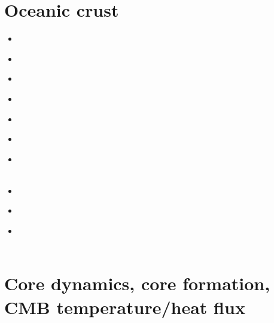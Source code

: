 \section{Oceanic crust} 

\begin{scriptsize}
\begin{itemize}
\item[\nineteeneightyeight] 
\textcite{mofo88} \\
\item[\nineteenninetyfour] 
\textcite{chho94} \\
\item[\nineteenninetysix] 
\textcite{vaky96} \\
\item[\twothousandfour] 
\textcite{vavv04b} \\
\item[\twothousandseven] 
\textcite{brva07b} \\
\item[\twothousandeight] 
\textcite{gomm08} \\
\item[\twothousandthirteen] 
\textcite{limc13} \\
\textcite{yosh13} \\
\item[\twothousandfifteen] 
\textcite{rula15} \\
\item[\twothousandseventeen] 
\textcite{taac17} \\
\item[\twothousandtwenty] 
\textcite{mugu20} \\
\textcite{yabt20} \\
\end{itemize}
\end{scriptsize}


\section{Core dynamics, core formation, CMB temperature/heat flux}

